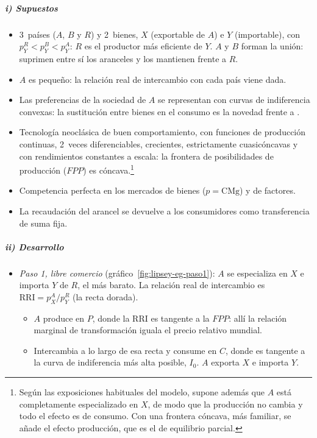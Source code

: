 \documentclass[11pt]{article}
\begin{document}
\subparagraph{i) Supuestos}

\begin{itemize}
\item 3~países ($A$, $B$ y $R$) y 2~bienes, $X$ (exportable de $A$) e $Y$ (importable), con $p_Y^R<p_Y^B<p_Y^A$: $R$ es el productor más eficiente de $Y$. $A$ y $B$ forman la unión: suprimen entre sí los aranceles y los mantienen frente a $R$.
\item $A$ es pequeño: la relación real de intercambio con cada país viene dada.
\item Las preferencias de la sociedad de $A$ se representan con curvas de indiferencia convexas: la sustitución entre bienes en el consumo es la novedad frente a .
\item Tecnología neoclásica de buen comportamiento, con funciones de producción continuas, 2~veces diferenciables, crecientes, estrictamente cuasicóncavas y con rendimientos constantes a escala: la frontera de posibilidades de producción ($FPP$) es cóncava.\footnote{Según las exposiciones habituales del modelo, \textcite{Lipsey1957Theory} supone además que $A$ está completamente especializado en $X$, de modo que la producción no cambia y todo el efecto es de consumo. Con una frontera cóncava, más familiar, se añade el efecto producción, que es el de equilibrio parcial.}
\item Competencia perfecta en los mercados de bienes ($p=\mathrm{CMg}$) y de factores.
\item La recaudación del arancel se devuelve a los consumidores como transferencia de suma fija.
\end{itemize}

\subparagraph{ii) Desarrollo}

\begin{itemize}
\item \emph{Paso 1, libre comercio} (gráfico~\ref{fig:lipsey-eg-paso1}): $A$ se especializa en $X$ e importa $Y$ de $R$, el más barato. La relación real de intercambio es $\mathrm{RRI}=p_X^A/p_Y^R$ (la recta dorada).
  \begin{itemize}
  \item $A$ produce en $P$, donde la RRI es tangente a la $FPP$: allí la relación marginal de transformación iguala el precio relativo mundial.
  \item Intercambia a lo largo de esa recta y consume en $C$, donde es tangente a la curva de indiferencia más alta posible, $I_0$. $A$ exporta $X$ e importa $Y$.
  \end{itemize}
\end{itemize}
\end{document}
